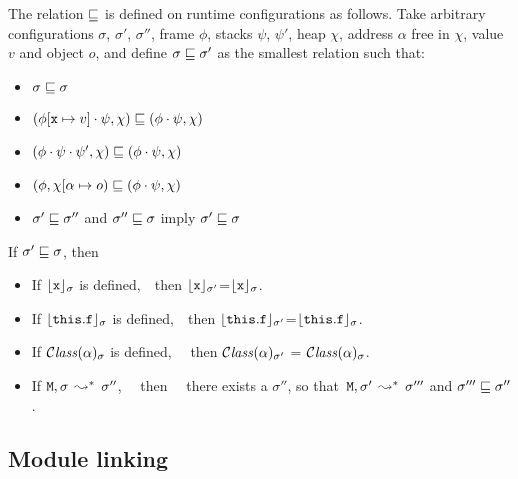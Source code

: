 \begin{definition}
The relation $\sqsubseteq$   is defined on runtime configurations as follows. Take arbitrary
configurations $\sigma$, $\sigma'$, $\sigma''$, frame $\phi$, stacks $\psi$, $\psi'$,  heap $\chi$, address $\alpha$ free in $\chi$, value $v$ and object $o$, and define $\sigma  \sqsubseteq \sigma'$ as the smallest relation such that:

\begin{itemize}
\item
$\sigma  \sqsubseteq \sigma$
\item
$(\phi[{\mbox{\tt{x}}} \mapsto v]\cdot \psi, \chi) \sqsubseteq  (\phi\cdot \psi, \chi)$
\item
$(\phi\cdot\psi\cdot\psi', \chi) \sqsubseteq  (\phi\cdot \psi, \chi)$
\item
$(\phi, \chi[\alpha \mapsto o) \sqsubseteq  (\phi\cdot \psi, \chi)$
\item
$\sigma'  \sqsubseteq \sigma''$ and $\sigma''  \sqsubseteq \sigma$ imply $\sigma'  \sqsubseteq \sigma$
\end{itemize}
\end{definition}



\begin{lemma}
If $\sigma'  \sqsubseteq \sigma$, then

\begin{itemize}
\item
If ${\lfloor{ {{\mbox{\tt{x}}}}}\rfloor_{\sigma}}$ is defined,\ \  then ${\lfloor{ {{\mbox{\tt{x}}}}}\rfloor_{\sigma'}}$=${\lfloor{ {{\mbox{\tt{x}}}}}\rfloor_{\sigma}}$.
\item
If ${\lfloor{ {{\mbox{\tt{this}}}.{\mbox{\tt{f}}}}}\rfloor_{\sigma}}$ is defined,\ \  then ${\lfloor{ {{\mbox{\tt{this}}}.{\mbox{\tt{f}}}}}\rfloor_{\sigma'}}$=${\lfloor{ {{\mbox{\tt{this}}}.{\mbox{\tt{f}}}}}\rfloor_{\sigma}}$.
\item
If ${\mathcal C}{\mathit{lass}}(\alpha)_{\sigma} $  is defined, \ \ then  ${\mathcal C}{\mathit{lass}}(\alpha)_{\sigma'} $  = ${\mathcal C}{\mathit{lass}}(\alpha)_{\sigma} $.
\item
If ${\mbox{\tt{\ensuremath{{\mbox{\tt{M}}}}}}}, \sigma \, \leadsto^*\, \sigma''$, \ \  then     \ \ there exists a $\sigma''$, so that\ ${\mbox{\tt{\ensuremath{{\mbox{\tt{M}}}}}}}, \sigma'\, \leadsto^*\, \sigma'''$
and $\sigma''' \sqsubseteq \sigma''$.
\end{itemize}
\end{lemma}




\subsection{Module linking}

